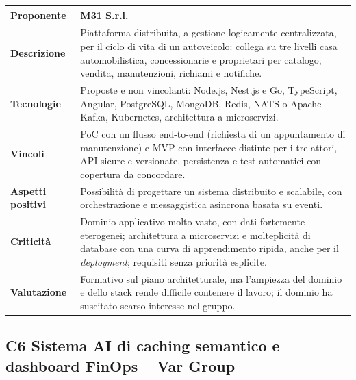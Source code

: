 \begin{longtable}{|>{\raggedright\arraybackslash}p{3.2cm}|>{\raggedright\arraybackslash}p{\dimexpr\textwidth-3.2cm-4\tabcolsep-3\arrayrulewidth\relax}|}
    \hline
    \textbf{Proponente} & M31 S.r.l. \\
    \hline
    \textbf{Descrizione} & Piattaforma distribuita, a gestione logicamente centralizzata, per il ciclo di vita di un autoveicolo: collega su tre livelli casa automobilistica, concessionarie e proprietari per catalogo, vendita, manutenzioni, richiami e notifiche. \\
    \hline
    \textbf{Tecnologie} & Proposte e non vincolanti: Node.js, Nest.js e Go, TypeScript, Angular, PostgreSQL, MongoDB, Redis, NATS o Apache Kafka, Kubernetes, architettura a microservizi. \\
    \hline
    \textbf{Vincoli} & PoC con un flusso end-to-end (richiesta di un appuntamento di manutenzione) e MVP con interfacce distinte per i tre attori, API sicure e versionate, persistenza e test automatici con copertura da concordare. \\
    \hline
    \textbf{Aspetti positivi} & Possibilità di progettare un sistema distribuito e scalabile, con orchestrazione e messaggistica asincrona basata su eventi. \\
    \hline
    \textbf{Criticità} & Dominio applicativo molto vasto, con dati fortemente eterogenei; architettura a microservizi e molteplicità di database con una curva di apprendimento ripida, anche per il \emph{deployment}; requisiti senza priorità esplicite. \\
    \hline
    \textbf{Valutazione} & Formativo sul piano architetturale, ma l'ampiezza del dominio e dello stack rende difficile contenere il lavoro; il dominio ha suscitato scarso interesse nel gruppo. \\
    \hline
\end{longtable}

\subsection{C6 Sistema AI di caching semantico e dashboard FinOps -- Var Group}

